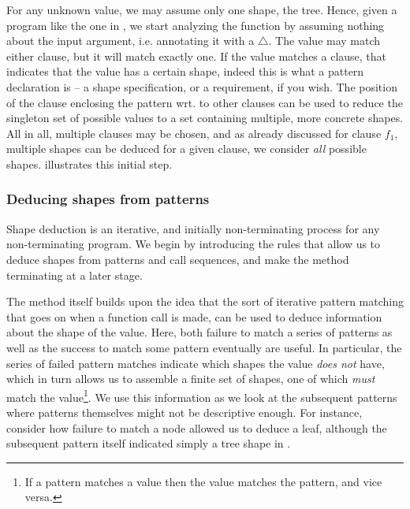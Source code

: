 For any unknown value, we may assume only one shape, the tree. Hence, given a
program like the one in , we start analyzing
the function  by assuming nothing about the input argument, i.e.
annotating it with a $\bigtriangleup$. The value may match either clause, but
it will match exactly one. If the value matches a clause, that indicates that
the value has a certain shape, indeed this is what a pattern declaration is --
a shape specification, or a requirement, if you wish. The position of the
clause enclosing the pattern wrt. to other clauses can be used to reduce the
singleton set of possible values to a set containing multiple, more concrete
shapes. All in all, multiple clauses may be chosen, and as already discussed
for clause $f_1$, multiple shapes can be deduced for a given clause, we
consider \emph{all} possible shapes.
 illustrates this initial step.


\subsubsection{Deducing shapes from patterns}

Shape deduction is an iterative, and initially non-terminating process for any
non-terminating program. We begin by introducing the rules that allow us to
deduce shapes from patterns and call sequences, and make the method terminating
at a later stage.

The method itself builds upon the idea that the sort of iterative pattern
matching that goes on when a function call is made, can be used to deduce
information about the shape of the value. Here, both failure to match a series
of patterns as well as the success to match some pattern eventually are useful.
In particular, the series of failed pattern matches indicate which shapes the
value \emph{does not} have, which in turn allows us to assemble a finite set of
shapes, one of which \emph{must} match the value\footnote{If a pattern matches
a value then the value matches the pattern, and vice versa.}. We use this
information as we look at the subsequent patterns where patterns themselves
might not be descriptive enough. For instance, consider how failure to match a
node allowed us to deduce a leaf, although the subsequent pattern itself
indicated simply a tree shape in .

